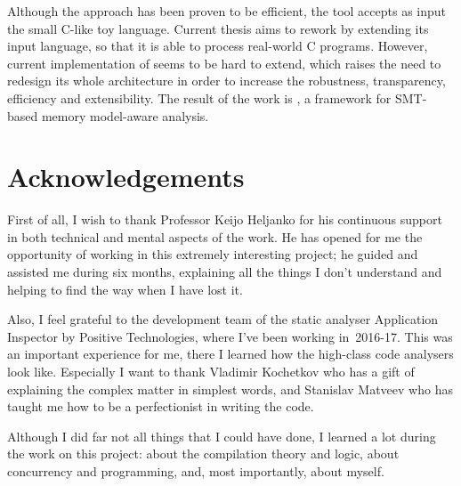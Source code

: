 \documentclass[12pt,a4paper,oneside,pdftex]{report}
\begin{document}
{Although the approach has been proven to be efficient, the tool accepts as input the small C-like toy language. %
Current thesis aims to rework \porthos{} by extending its input language, so that it is able to process real-world C programs.
However, current implementation of \porthos{} seems to be hard to extend, which raises the need to redesign its whole architecture in order to increase the robustness, transparency, efficiency and extensibility.
The result of the work is \textit{\porthos[2]}, a framework for SMT-based memory model-aware analysis.
}


\chapter*{Acknowledgements}
First of all, I wish to thank Professor Keijo Heljanko for his continuous support in both technical and mental aspects of the work.
He has opened for me the opportunity of working in this extremely interesting project; he guided and assisted me during six months, explaining all the things I don't understand and helping to find the way when I have lost it.

Also, I feel grateful to the development team of the static analyser Application Inspector by Positive Technologies, where I've been working in~2016-17.
This was an important experience for me, there I learned how the high-class code analysers look like.
Especially I want to thank Vladimir Kochetkov who has a gift of explaining the complex matter in simplest words, and Stanislav Matveev who has taught me how to be a perfectionist in writing the code.

Although I did far not all things that I could have done, I learned a lot during the work on this project: about the compilation theory and logic, about concurrency and programming, and, most importantly, about myself.
\end{document}
